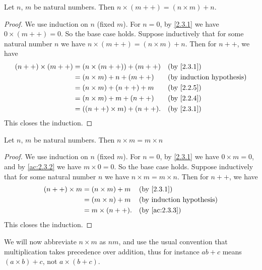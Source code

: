 \begin{ac}\label{ac:2.3.3}
  Let \(n\), \(m\) be natural numbers.
  Then \(n \times (m++) = (n \times m) + n\).
\end{ac}

\begin{proof}
  We use induction on \(n\) (fixed \(m\)).
  For \(n = 0\), by \cref{2.3.1} we have \(0 \times (m++) = 0\).
  So the base case holds.
  Suppose inductively that for some natural number \(n\) we have \(n \times (m++) = (n \times m) + n\).
  Then for \(n++\), we have
  \begin{align*}
    (n++) \times (m++)
     & = (n \times (m++)) + (m++)  &  & \by{2.3.1} \\
     & = (n \times m) + n + (m++)  &  & \byIH      \\
     & = (n \times m) + (n++) + m  &  & \by{2.2.5} \\
     & = (n \times m) + m + (n++)  &  & \by{2.2.4} \\
     & = ((n++) \times m) + (n++). &  & \by{2.3.1}
  \end{align*}
  This closes the induction.
\end{proof}

\begin{lem}\label{2.3.2}
  Let \(n\), \(m\) be natural numbers.
  Then \(n \times m = m \times n\)
\end{lem}

\begin{proof}
  We use induction on \(n\) (fixed \(m\)).
  For \(n = 0\), by \cref{2.3.1} we have \(0 \times m = 0\), and by \cref{ac:2.3.2} we have \(m \times 0 = 0\).
  So the base case holds.
  Suppose inductively that for some natural number \(n\) we have \(n \times m = m \times n\).
  Then for \(n++\), we have
  \begin{align*}
    (n++) \times m & = (n \times m) + m &  & \by{2.3.1}    \\
                   & = (m \times n) + m &  & \byIH         \\
                   & = m \times (n++).  &  & \by{ac:2.3.3}
  \end{align*}
  This closes the induction.
\end{proof}

\begin{note}
  We will now abbreviate \(n \times m\) as \(nm\), and use the usual convention that multiplication takes precedence over addition, thus for instance \(ab + c\) means \((a \times b) + c\), not \(a \times (b + c)\).
\end{note}

